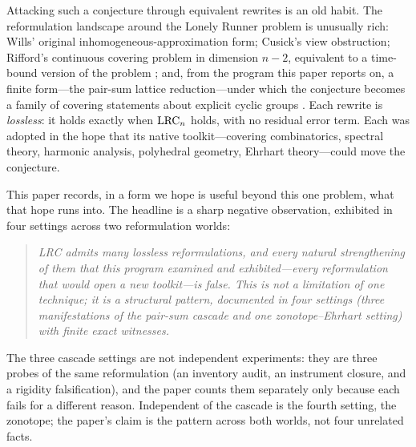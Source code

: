 Attacking such a conjecture through equivalent rewrites is an old habit.
The reformulation landscape around the Lonely Runner problem is unusually
rich: Wills' original inhomogeneous-approximation form; Cusick's view
obstruction; Rifford's continuous covering problem in dimension $n-2$,
equivalent to a time-bound version of the problem \cite{Rifford}; and, from
the program this paper reports on, a finite form---the pair-sum lattice
reduction---under which the conjecture becomes a family of covering
statements about explicit cyclic groups \cite{PS-survey,prog-artifacts}.
Each rewrite is \emph{lossless}: it holds exactly when $\mathrm{LRC}_n$ holds,
with no residual error term. Each was adopted in the hope that its native
toolkit---covering combinatorics, spectral theory, harmonic analysis,
polyhedral geometry, Ehrhart theory---could move the conjecture.

This paper records, in a form we hope is useful beyond this one problem,
what that hope runs into. The headline is a sharp negative observation,
exhibited in four settings across two reformulation worlds:

\begin{quote}
\emph{LRC admits many lossless reformulations, and every natural
strengthening of them that this program examined and exhibited---every
reformulation that would open a new toolkit---is false. This is not a
limitation of one technique; it is a structural pattern, documented in
four settings (three manifestations of the pair-sum cascade and one
zonotope--Ehrhart setting) with finite exact witnesses.}
\end{quote}

The three cascade settings are not independent experiments: they are three
probes of the same reformulation (an inventory audit, an instrument
closure, and a rigidity falsification), and the paper counts them
separately only because each fails for a different reason. Independent of
the cascade is the fourth setting, the zonotope; the paper's claim is the
pattern across both worlds, not four unrelated facts.

